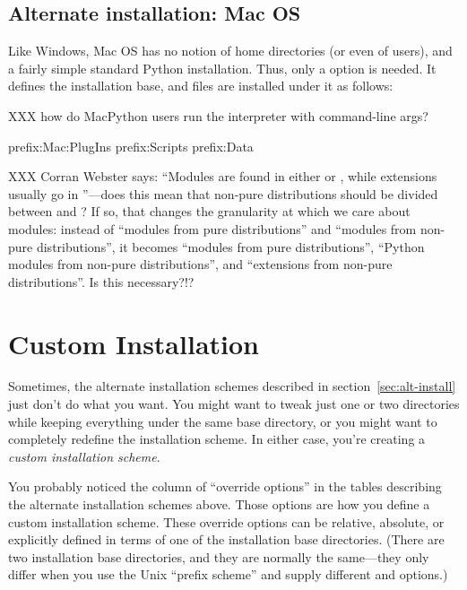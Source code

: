 \documentclass{howto}
\begin{document}
\subsection{Alternate installation: Mac OS}
\label{sec:alt-macos}

Like Windows, Mac OS has no notion of home directories (or even of
users), and a fairly simple standard Python installation.  Thus, only a
 option is needed.  It defines the installation base, and 
files are installed under it as follows:

XXX how do MacPython users run the interpreter with command-line args?

              {prefix}{:Mac:PlugIns}
              {prefix}{:Scripts}
              {prefix}{:Data}

XXX Corran Webster says: ``Modules are found in either  or
, while extensions usually go in
''---does this mean that non-pure distributions should
be divided between  and ?  If so, that
changes the granularity at which we care about modules: instead of
``modules from pure distributions'' and ``modules from non-pure
distributions'', it becomes ``modules from pure distributions'',
``Python modules from non-pure distributions'', and ``extensions from
non-pure distributions''.  Is this necessary?!?


\section{Custom Installation}
\label{sec:custom-install}

Sometimes, the alternate installation schemes described in
section~\ref{sec:alt-install} just don't do what you want.  You might
want to tweak just one or two directories while keeping everything under
the same base directory, or you might want to completely redefine the
installation scheme.  In either case, you're creating a \emph{custom
  installation scheme}.

You probably noticed the column of ``override options'' in the tables
describing the alternate installation schemes above.  Those options are
how you define a custom installation scheme.  These override options can
be relative, absolute, or explicitly defined in terms of one of the
installation base directories.  (There are two installation base
directories, and they are normally the same---they only differ when you
use the Unix ``prefix scheme'' and supply different  and
 options.)
\end{document}
